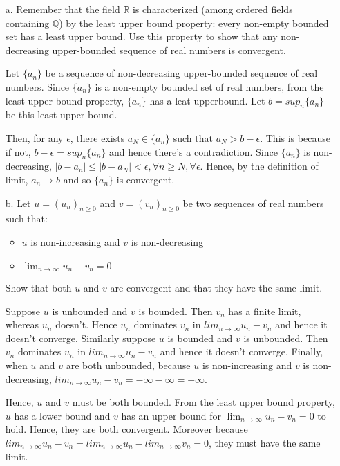 \documentclass[11pt]{article}
\newcommand{\R}{\mathbb{R}}                     %
\begin{document}
\begin{itemize}
    \item[a.] Remember that the field $\R$ is characterized (among ordered
        fields containing $\mathbb{Q}$) by the least upper bound property:
        every non-empty bounded set has a least upper bound. Use this property
        to show that any non-decreasing upper-bounded sequence of real numbers
        is convergent.

\color{blue}
Let $\{a_n\}$ be a sequence of non-decreasing upper-bounded sequence of real numbers. Since $\{a_n\}$ is a non-empty bounded set of real numbers, from the least upper bound property, $\{a_n\}$ has a leat upperbound. Let $b=sup_n \{a_n\}$ be this least upper bound.

Then, for any $\epsilon$, there exists $a_N \in \{a_n\}$ such that $a_N > b-\epsilon$. This is because if not, $b-\epsilon=sup_n \{a_n\}$ and hence there's a contradiction. Since $\{a_n\}$ is non-decreasing, $|b-a_n| \leq |b-a_N| < \epsilon, \forall n \geq N, \forall \epsilon$. Hence, by the definition of limit, $a_n \rightarrow b$ and so $\{a_n\}$ is convergent.
\color{black}

\item[b.] Let $u = (u_n)_{n\geq 0}$ and $v = (v_n)_{n\geq 0}$ be two sequences of
real numbers such that:
\begin{itemize}
    \item $u$ is non-increasing and $v$ is non-decreasing
    \item $\lim_{n\to\infty} u_n - v_n = 0$
\end{itemize}
Show that both $u$ and $v$ are convergent and that they have the same limit.

\color{blue}
Suppose $u$ is unbounded and $v$ is bounded. Then $v_n$ has a finite limit, whereas $u_n$ doesn't. Hence $u_n$ dominates $v_n$ in $lim_{n\rightarrow \infty}u_n-v_n$ and hence it doesn't converge. Similarly suppose $u$ is bounded and $v$ is unbounded. Then $v_n$ dominates $u_n$ in $lim_{n\rightarrow \infty}u_n-v_n$ and hence it doesn't converge. Finally, when $u$ and $v$ are both unbounded, because $u$ is non-increasing and $v$ is non-decreasing, $lim_{n\rightarrow \infty}u_n-v_n=-\infty-\infty=-\infty$.

Hence, $u$ and $v$ must be both bounded. From the least upper bound property, $u$ has a lower bound and $v$ has an upper bound for $\lim_{n\to\infty} u_n - v_n = 0$ to hold. Hence, they are both convergent. Moreover because $lim_{n\rightarrow \infty}u_n-v_n=lim_{n\rightarrow \infty}u_n-lim_{n\rightarrow \infty}v_n=0$, they must have the same limit.
\color{black}



\end{itemize}
\end{document}
